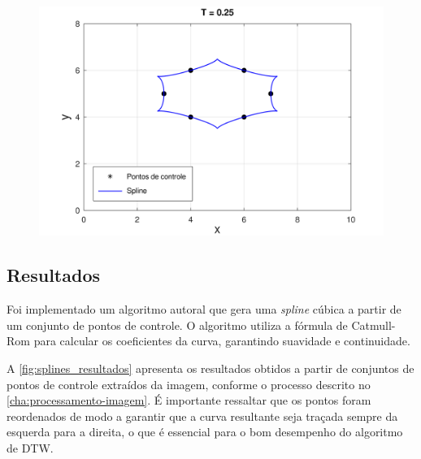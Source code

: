 \begin{figure}[h!]
    \begin{minipage}[b]{0.45\textwidth}
        \centering
        \includegraphics[width=1\linewidth]{fig/cat_rom_t025.png}
        \label{fig:tensao025}
    \end{minipage}
    \label{fig:tensao}
\end{figure}

\subsection{Resultados}

Foi implementado um algoritmo autoral que gera uma \textit{spline} cúbica a partir de um conjunto de pontos de controle. O algoritmo utiliza a fórmula de Catmull-Rom para calcular os coeficientes da curva, garantindo suavidade e continuidade. 

A \autoref{fig:splines_resultados} apresenta os resultados obtidos a partir de conjuntos de pontos de controle extraídos da imagem, conforme o processo descrito no \autoref{cha:processamento-imagem}. É importante ressaltar que os pontos foram reordenados de modo a garantir que a curva resultante seja traçada sempre da esquerda para a direita, o que é essencial para o bom desempenho do algoritmo de DTW.


